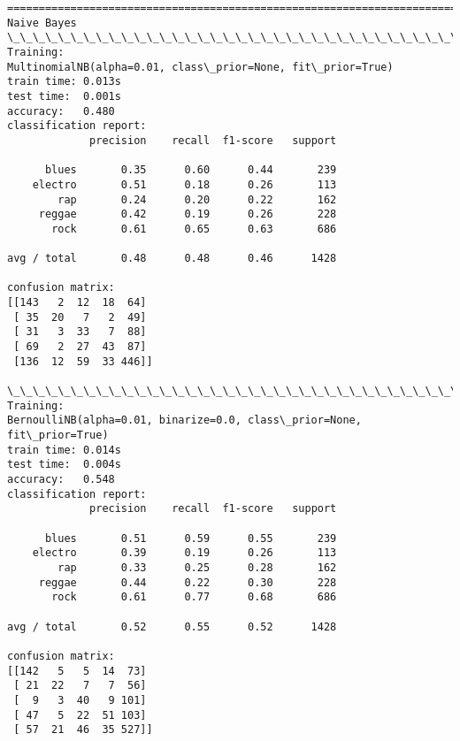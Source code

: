 \documentclass[11pt]{article}
\begin{document}
    \begin{Verbatim}[commandchars=\\\{\}]
================================================================================
Naive Bayes
\_\_\_\_\_\_\_\_\_\_\_\_\_\_\_\_\_\_\_\_\_\_\_\_\_\_\_\_\_\_\_\_\_\_\_\_\_\_\_\_\_\_\_\_\_\_\_\_\_\_\_\_\_\_\_\_\_\_\_\_\_\_\_\_\_\_\_\_\_\_\_\_\_\_\_\_\_\_\_\_
Training: 
MultinomialNB(alpha=0.01, class\_prior=None, fit\_prior=True)
train time: 0.013s
test time:  0.001s
accuracy:   0.480
classification report:
             precision    recall  f1-score   support

      blues       0.35      0.60      0.44       239
    electro       0.51      0.18      0.26       113
        rap       0.24      0.20      0.22       162
     reggae       0.42      0.19      0.26       228
       rock       0.61      0.65      0.63       686

avg / total       0.48      0.48      0.46      1428

confusion matrix:
[[143   2  12  18  64]
 [ 35  20   7   2  49]
 [ 31   3  33   7  88]
 [ 69   2  27  43  87]
 [136  12  59  33 446]]

\_\_\_\_\_\_\_\_\_\_\_\_\_\_\_\_\_\_\_\_\_\_\_\_\_\_\_\_\_\_\_\_\_\_\_\_\_\_\_\_\_\_\_\_\_\_\_\_\_\_\_\_\_\_\_\_\_\_\_\_\_\_\_\_\_\_\_\_\_\_\_\_\_\_\_\_\_\_\_\_
Training: 
BernoulliNB(alpha=0.01, binarize=0.0, class\_prior=None, fit\_prior=True)
train time: 0.014s
test time:  0.004s
accuracy:   0.548
classification report:
             precision    recall  f1-score   support

      blues       0.51      0.59      0.55       239
    electro       0.39      0.19      0.26       113
        rap       0.33      0.25      0.28       162
     reggae       0.44      0.22      0.30       228
       rock       0.61      0.77      0.68       686

avg / total       0.52      0.55      0.52      1428

confusion matrix:
[[142   5   5  14  73]
 [ 21  22   7   7  56]
 [  9   3  40   9 101]
 [ 47   5  22  51 103]
 [ 57  21  46  35 527]]


    \end{Verbatim}
\end{document}

